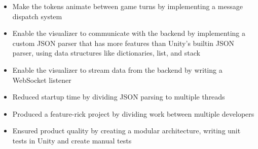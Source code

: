 
\begin{itemize}
  \item Make the tokens animate between game turns by implementing a message
  dispatch system
  \item Enable the visualizer to communicate with the backend by implementing
  a custom JSON parser that has more features than Unity's builtin JSON parser,
  using data structures like dictionaries, list, and stack
  \item Enable the visualizer to stream data from the backend by writing a
  WebSocket listener
  \item Reduced startup time by dividing JSON parsing to multiple threads
  \item Produced a feature-rick project by dividing work between multiple
  developers
  \item Ensured product quality by creating a modular architecture, writing
  unit tests in Unity and create manual tests
\end{itemize}
